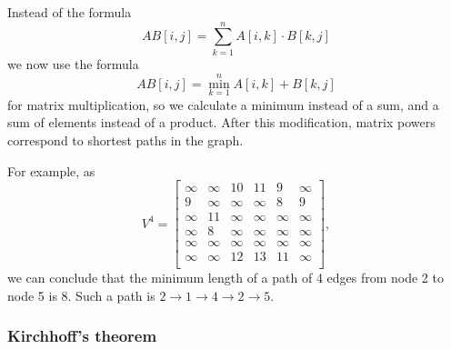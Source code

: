 Instead of the formula
\[
    AB[i,j] = \sum_{k=1}^n A[i,k] \cdot B[k,j]
\]
we now use the formula
\[
    AB[i,j] = \min_{k=1}^n A[i,k] + B[k,j]
\]
for matrix multiplication, so we calculate
a minimum instead of a sum,
and a sum of elements instead of a product.
After this modification,
matrix powers correspond to
shortest paths in the graph.

For example, as
\[
    V^4= \begin{bmatrix}
        \infty & \infty & 10     & 11     & 9      & \infty \\
        9      & \infty & \infty & \infty & 8      & 9      \\
        \infty & 11     & \infty & \infty & \infty & \infty \\
        \infty & 8      & \infty & \infty & \infty & \infty \\
        \infty & \infty & \infty & \infty & \infty & \infty \\
        \infty & \infty & 12     & 13     & 11     & \infty \\
    \end{bmatrix},
\]
we can conclude that the minimum length of a path
of 4 edges
from node 2 to node 5 is 8.
Such a path is
$2 \rightarrow 1 \rightarrow 4 \rightarrow 2 \rightarrow 5$.

\subsubsection{Kirchhoff's theorem}



